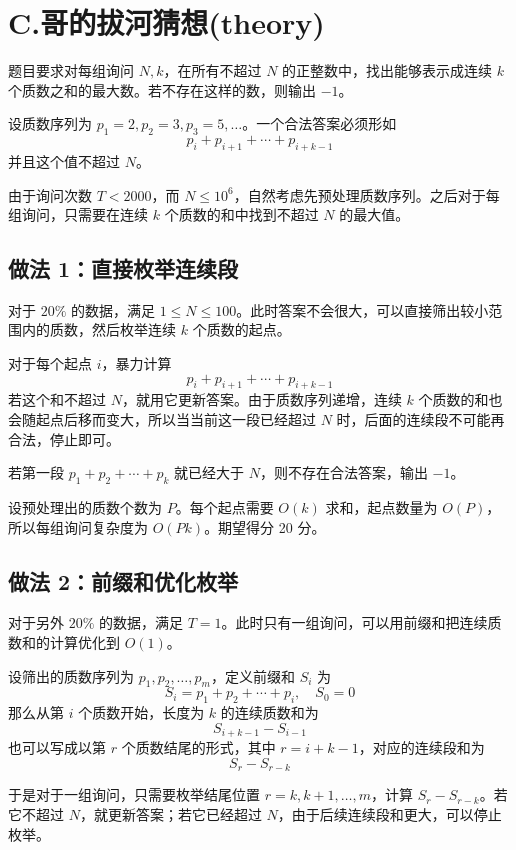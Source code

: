 \documentclass[12pt]{ctexart}  %
\begin{document}

\section{C.哥的拔河猜想(theory)}

题目要求对每组询问 $N,k$，在所有不超过 $N$ 的正整数中，找出能够表示成连续 $k$ 个质数之和的最大数。若不存在这样的数，则输出 $-1$。

设质数序列为 $p_1=2,p_2=3,p_3=5,\dots$。一个合法答案必须形如
$$
p_i+p_{i+1}+\cdots+p_{i+k-1}
$$
并且这个值不超过 $N$。

由于询问次数 $T<2000$，而 $N\le 10^6$，自然考虑先预处理质数序列。之后对于每组询问，只需要在连续 $k$ 个质数的和中找到不超过 $N$ 的最大值。

\subsection{做法 1：直接枚举连续段}

对于 $20\%$ 的数据，满足 $1\le N\le 100$。此时答案不会很大，可以直接筛出较小范围内的质数，然后枚举连续 $k$ 个质数的起点。

对于每个起点 $i$，暴力计算
$$
p_i+p_{i+1}+\cdots+p_{i+k-1}
$$
若这个和不超过 $N$，就用它更新答案。由于质数序列递增，连续 $k$ 个质数的和也会随起点后移而变大，所以当当前这一段已经超过 $N$ 时，后面的连续段不可能再合法，停止即可。

若第一段 $p_1+p_2+\cdots+p_k$ 就已经大于 $N$，则不存在合法答案，输出 $-1$。

设预处理出的质数个数为 $P$。每个起点需要 $O(k)$ 求和，起点数量为 $O(P)$，所以每组询问复杂度为 $O(Pk)$。期望得分 20 分。

\subsection{做法 2：前缀和优化枚举}

对于另外 $20\%$ 的数据，满足 $T=1$。此时只有一组询问，可以用前缀和把连续质数和的计算优化到 $O(1)$。

设筛出的质数序列为 $p_1,p_2,\dots,p_m$，定义前缀和 $S_i$ 为
$$
S_i=p_1+p_2+\cdots+p_i,\quad S_0=0
$$
那么从第 $i$ 个质数开始，长度为 $k$ 的连续质数和为
$$
S_{i+k-1}-S_{i-1}
$$
也可以写成以第 $r$ 个质数结尾的形式，其中 $r=i+k-1$，对应的连续段和为
$$
S_r-S_{r-k}
$$

于是对于一组询问，只需要枚举结尾位置 $r=k,k+1,\dots,m$，计算 $S_r-S_{r-k}$。若它不超过 $N$，就更新答案；若它已经超过 $N$，由于后续连续段和更大，可以停止枚举。
\end{document}
